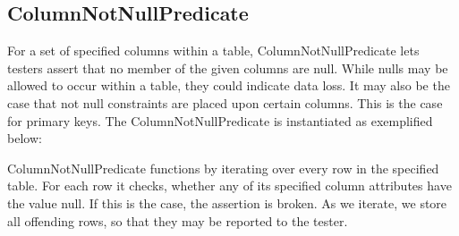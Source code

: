 \subsection{ColumnNotNullPredicate}
For a set of specified columns within a table, ColumnNotNullPredicate lets testers assert that no member of the given columns are null. While nulls may be allowed to occur within a table, they could indicate data loss. It may also be the case that not null constraints are placed upon certain columns. This is the case for primary keys. The ColumnNotNullPredicate is instantiated as exemplified below:


ColumnNotNullPredicate functions by iterating over every row in the specified table. For each row it checks, whether any of its specified column attributes have the value null. If this is the case, the assertion is broken. As we iterate, we store all offending rows, so that they may be reported to the tester. 

